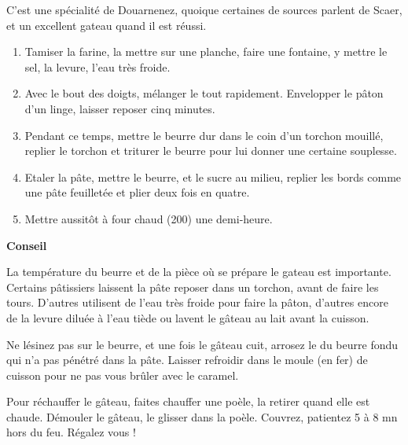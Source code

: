 
C'est une sp\'ecialit\'e de Douarnenez, quoique certaines de sources
parlent de Scaer, et un excellent gateau quand il est r\'eussi.

\begin{ingredients}
\end{ingredients}


\begin{recipe}
  \begin{enumerate}

  \item Tamiser la farine, la mettre sur une planche, faire une
    fontaine, y mettre le sel, la levure, l'eau tr\`es froide.

  \item Avec le bout des doigts, m\'elanger le tout
    rapidement. Envelopper le p\^aton d'un linge, laisser reposer cinq
    minutes.

  \item Pendant ce temps, mettre le beurre dur dans le coin d'un
    torchon mouill\'e, replier le torchon et triturer le beurre pour lui
    donner une certaine souplesse.

  \item Etaler la p\^ate, mettre le beurre, et le sucre au milieu,
    replier les bords comme une p\^ate feuillet\'ee et plier deux fois en
    quatre.

  \item Mettre aussit\^ot \`a four chaud (200\degreeC) une demi-heure.

  \end{enumerate}

  \textbf{Conseil}

  La temp\'erature du beurre et de la pi\`ece o\`u se pr\'epare le gateau est
  importante. Certains p\^atissiers laissent la p\^ate reposer dans un
  torchon, avant de faire les tours. D'autres utilisent de l'eau tr\`es
  froide pour faire la p\^aton, d'autres encore de la levure dilu\'ee \`a
  l'eau ti\`ede ou lavent le g\^ateau au lait avant la cuisson.

  Ne l\'esinez pas sur le beurre, et une fois le g\^ateau cuit, arrosez le
  du beurre fondu qui n'a pas p\'en\'etr\'e dans la p\^ate. Laisser refroidir
  dans le moule (en fer) de cuisson pour ne pas vous br\^uler avec le
  caramel.

  Pour r\'echauffer le g\^ateau, faites chauffer une po\`ele, la retirer
  quand elle est chaude. D\'emouler le g\^ateau, le glisser dans la
  po\`ele. Couvrez, patientez 5 \`a 8 mn hors du feu. R\'egalez vous !

\end{recipe}

